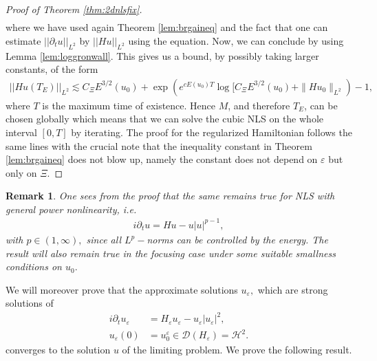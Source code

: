 \documentclass[11pt, oneside]{article}   	%
\newtheorem{remark}[theorem]{Remark}
\newcommand{\ssp}{\mathscr{H}}
\begin{document}
\begin{proof}[Proof of Theorem \ref{thm:2dnlsfix}]
\begin{align*}
	\end{align*} 
	where we have used again Theorem \ref{lem:brgaineq} and the fact that one can estimate $||\partial_t u||_{L^2}$ by $||H u||_{L^2}$ using the equation. Now, we can conclude by using Lemma \ref{lem:loggronwall}. This gives us a bound, by possibly taking larger constants,  of the form
	\begin{align}\label{equ:domtimeEstimate}
	||H u(T_E)||_{L^2}\lesssim C_\Xi {E}^{3/2}(u_0)+ \exp (e^{ c E(u_0)T}
	\log [C_\Xi {E}^{3/2}(u_0) + \| H u_0 \|_{L^2}  )-1,
	\end{align}
	where $T$ is the maximum time of existence. Hence $M$, and therefore $T_E$, can be chosen globally which means that we can solve the cubic NLS on the whole interval $[0,T]$ by iterating.
	The proof for the regularized Hamiltonian follows the same lines with the crucial note that the inequality constant in Theorem \ref{lem:brgaineq} does not blow up, namely the constant does not depend on $\varepsilon$ but only on  $\Xi.$  
\end{proof}
\begin{remark}\upshape\upshape\label{rem:nlsdiffpowerfocsmalldata}
	One sees from the proof that the same remains true for NLS with general power nonlinearity, i.e.
	\begin{align*}
	i\partial_tu=H u-u|u|^{p-1},
	\end{align*}
	with $p\in(1,\infty),$ since all $L^p-$norms can be controlled by the energy. The result will also remain true in the focusing case under some suitable smallness conditions on $u_0.$
\end{remark}
%
We will moreover prove that the approximate solutions $u_\varepsilon,$ which are strong solutions of 
\begin{align} \label{eqn:nlsdomapp}
i\partial_t u_{\varepsilon} &=  H_{\varepsilon} u_{\varepsilon}-u_\varepsilon|u_\varepsilon|^2,  \\ \nonumber
u_\varepsilon(0)&=u^\varepsilon_0\in \mathscr{D}({H_{\varepsilon}} )= \ssp^2. \end{align}
converges to the solution $u$ of the limiting problem.
%
We prove the following result.
\end{document}
